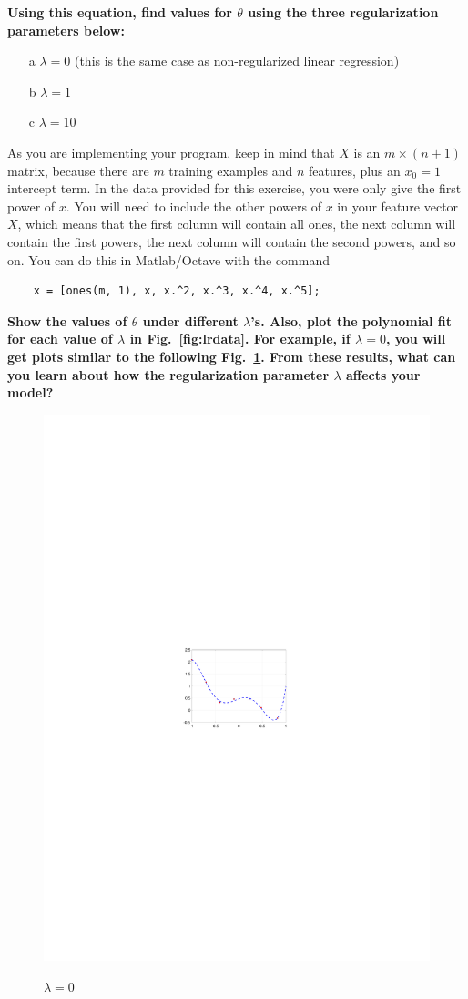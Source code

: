 \documentclass[10pt,a4paper]{article}
\begin{document}
  \textbf{Using this equation, find values for $\theta$ using the three regularization parameters below:}
  \begin{itemize}
    \item[a] $\lambda = 0$ (this is the same case as non-regularized linear regression)
    \item[b] $\lambda = 1$
    \item[c] $\lambda = 10$
  \end{itemize}
  As you are implementing your program, keep in mind that $X$ is an  $m \times (n+1)$ matrix, because there are $m$ training examples and $n$ features, plus an $x_0 = 1$ intercept term. In the data provided for this exercise, you were only give the first power of  $x$. You will need to include the other powers of $x$ in your feature vector $X$, which means that the first column will contain all ones, the next column will contain the first powers, the next column will contain the second powers, and so on. You can do this in Matlab/Octave with the command
  \begin{lstlisting}
    x = [ones(m, 1), x, x.^2, x.^3, x.^4, x.^5];
  \end{lstlisting}
  \textbf{Show the values of $\theta$ under different $\lambda$'s. Also, plot the polynomial fit for each value of $\lambda$ in Fig.~\ref{fig:lrdata}. For example, if $\lambda=0$, you will get plots similar to the following Fig.~\ref{fig:lambda0}. From these results, what can you learn about how the regularization parameter $\lambda$ affects your model?}
  \begin{figure}[htb!]
  \centering
    \includegraphics[width=.7\columnwidth]{lambda0}
  \label{fig:lambda0}
  \caption{$\lambda = 0$}
  \end{figure}
  
\end{document}
